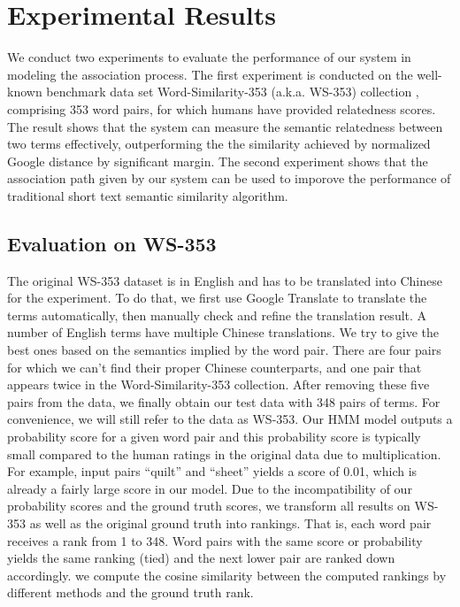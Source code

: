 \section{Experimental Results}
\label{sec:eval}
We conduct two experiments to evaluate the performance of our system 
in modeling the association process. The first experiment is 
conducted on the well-known benchmark data set Word-Similarity-353 
(a.k.a. WS-353) collection \cite{FinkelsteinGMRSWR02}, 
comprising 353 word pairs, 
for which humans have provided relatedness scores. The result shows that 
the system can measure the semantic relatedness between two terms effectively, 
outperforming the the similarity achieved by normalized Google distance
by significant margin. 
The second experiment shows that the association path given by our system 
can be used to imporove the performance of traditional short text semantic similarity 
algorithm.

\subsection{Evaluation on WS-353}
The original WS-353 dataset is in English and has to be 
translated into Chinese for the experiment. 
To do that, we first use Google Translate to translate the terms 
automatically, then manually check and refine the translation result. A
number of English terms have multiple Chinese translations. We try to give
the best ones based on the semantics implied by the word pair. 
There are four pairs for which we can't find their proper Chinese counterparts,
and one pair that appears twice in the Word-Similarity-353 collection. 
After removing these five pairs from the data, we finally obtain our
test data with 348 pairs of terms. For convenience, we will still refer to the
data as WS-353. Our HMM model outputs a probability score for 
a given word pair and this probability score is typically small compared to
the human ratings in the original data due to multiplication. For example,
input pairs ``quilt'' and ``sheet'' yields a score of 0.01, which is 
already a fairly large score in our model. Due to the incompatibility of our
probability scores and the ground truth scores, we transform all results on
WS-353 as well as the original ground truth into rankings. That is, each
word pair receives a rank from 1 to 348. Word pairs with the same score or
probability yields the same ranking (tied) and the next lower pair 
are ranked down accordingly.
we compute the cosine similarity between the computed rankings by different
methods and the ground truth rank. 

